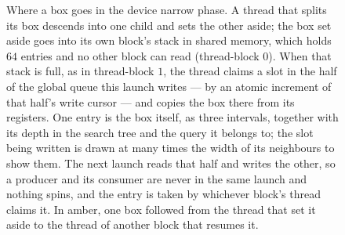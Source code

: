 \begin{figure}[htbp]
  \centering
  \resizebox{0.86\linewidth}{!}{}
  \caption{Where a box goes in the device narrow phase. A thread that splits
    its box descends into one child and sets the other aside; the box set aside
    goes into its own block's stack in shared memory, which holds $64$ entries
    and no other block can read (thread-block $0$). When that stack is full, as
    in thread-block $1$, the thread claims a slot in the half of the global
    queue this launch writes --- by an atomic increment of that half's write
    cursor --- and copies the box there from its registers. One entry is the box
    itself, as three intervals, together with its depth in the search tree and
    the query it belongs to; the slot being written is drawn at many times the
    width of its neighbours to show them. The next launch reads that half and
    writes the other, so a producer and its consumer are never in the same
    launch and nothing spins, and the entry is taken by whichever block's thread
    claims it. In amber, one box followed from the thread that set it aside to
    the thread of another block that resumes it.}
  \label{fig:gpu-workflow}
\end{figure}


